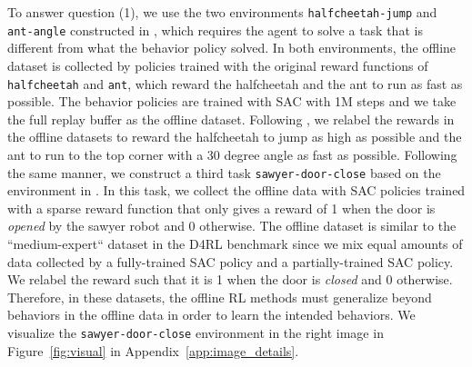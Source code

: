 \begin{table}
\centering
\scriptsize
{}
\vspace{-0.2cm}
\caption{
\footnotesize Average returns of \texttt{halfcheetah-jump} and \texttt{ant-angle} and average success rate of \texttt{sawyer-door-close} that require out-of-distribution generalization. All results are averaged over 3 random seeds. We include the mean and max undiscounted return / success rate of the episodes in the batch data (under Batch Mean and Batch Max, respectively) for comparison.
}
\vspace{-0.3cm}
\label{tbl:generalize}
\normalsize
\end{table}

To answer question (1), we use the two environments \texttt{halfcheetah-jump} and \texttt{ant-angle} constructed in \citet{yu2020mopo}, which requires the agent to solve a task that is different from what the behavior policy solved. In both environments, the offline dataset is collected by policies trained with the original reward functions of \texttt{halfcheetah} and \texttt{ant}, which reward the halfcheetah and the ant to run as fast as possible. The behavior policies are trained with SAC with 1M steps and we take the full replay buffer as the offline dataset. Following \citet{yu2020mopo}, we relabel the rewards in the offline datasets to reward the halfcheetah to jump as high as possible and the ant to run to the top corner with a 30 degree angle as fast as possible. Following the same manner, we construct a third task \texttt{sawyer-door-close} based on the environment in \citet{yu2020meta, Rafailov2020LOMPO}. In this task, we collect the offline data with SAC policies trained with a sparse reward function that only gives a reward of 1 when the door is \textit{opened} by the sawyer robot and 0 otherwise. The offline dataset is similar to the ``medium-expert`` dataset in the D4RL benchmark since we mix equal amounts of data collected by a fully-trained SAC policy and a partially-trained SAC policy. We relabel the reward such that it is 1 when the door is \textit{closed} and 0 otherwise. Therefore, in these datasets, the offline RL methods must generalize beyond behaviors in the offline data in order to learn the intended behaviors. We visualize the \texttt{sawyer-door-close} environment in the right image in Figure~\ref{fig:visual} in Appendix~\ref{app:image_details}.

